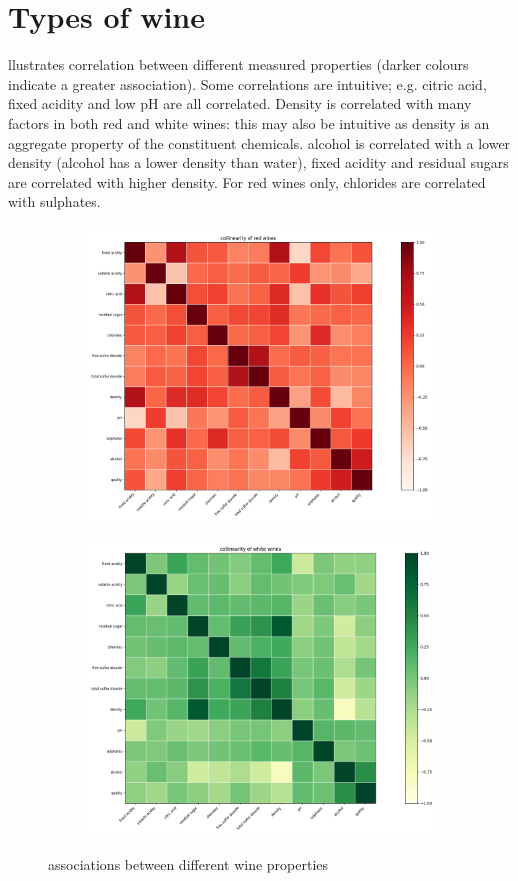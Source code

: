 \documentclass{article}
\begin{document}
\section*{Types of wine}
llustrates correlation between different measured properties (darker colours indicate a greater association).  Some correlations are intuitive; 
e.g. citric acid, fixed acidity and low pH are all correlated.
Density is correlated with many factors in both red and white wines: this may also be intuitive as density is an aggregate property of the 
constituent chemicals.
alcohol is correlated with a lower density (alcohol has a lower density than water), 
fixed acidity and residual sugars are correlated with higher density.  
For red wines only, chlorides are correlated with sulphates.

\begin{figure}[H]
\centering
\begin{subfigure}
  \centering
  \includegraphics[width=0.4\linewidth]{figures/red_corr.png}
\end{subfigure}%
\begin{subfigure}
  \centering
  \includegraphics[width=0.4\linewidth]{figures/white_corr.png}
\end{subfigure}
\caption{associations between different wine properties}
\label{fig:correlations}
\end{figure}
\end{document}

